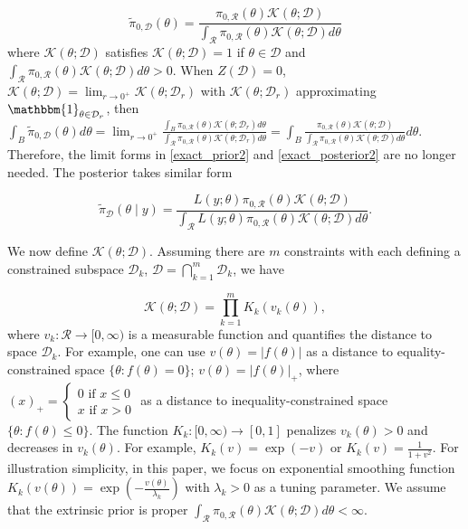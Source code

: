 \documentclass[10pt]{article}
\newcommand{\mc}[1]{\mathcal{#1}}
\DeclareMathOperator{\1}{\mathbbm{1}}
\begin{document}
\begin{equation}
\label{extrinsic_prior}
	\tilde{\pi}_{0,\mc D}(\theta) = \frac{ \pi_{0,\mc R}(\theta) \mc{K}( \theta; \mc D) }{ \int_{\mc R} \pi_{0,\mc R}(\theta) \mc{K}(\theta; \mc D)d\theta }
\end{equation}
where $\mc K(\theta; \mc D)$ satisfies $\mc K(\theta; \mc D)=1$ if $\theta\in \mc D$ and $ \int_{\mc R} \pi_{0,\mc R}(\theta) \mc{K}(\theta; \mc D)d\theta>0$. When $Z(\mc D)=0$, $\mc K(\theta;  \mc D)=\lim_{r\rightarrow 0^+}\mc K(\theta;  \mc D_r)$ with $\mc{K}(\theta; \mc D_r)$ approximating $\mathbbm{1}_{\theta\in  \mc D_r}$, then $
	\int_{B} \tilde{\pi}_{0,\mc D}(\theta) d \theta =  \lim_{r\rightarrow 0^+}\frac{\int_{B}  \pi_{0,\mc R}(\theta) \mc{K}( \theta; \mc D_r)d\theta }{ \int_{\mc R} \pi_{0,\mc R}(\theta) \mc{K}(\theta; \mc D_r)d\theta } = 	\int_{B} \frac{ \pi_{0,\mc R}(\theta) \mc{K}( \theta; \mc D) }{ \int_{\mc R} \pi_{0,\mc R}(\theta) \mc{K}(\theta; \mc D)d\theta } d\theta$. Therefore, the limit forms in \eqref{exact_prior2} and \eqref{exact_posterior2} are no longer needed. The posterior takes similar form

\begin{equation}
\label{extrinsic_posterior}
	\tilde{\pi}_{\mc D}(\theta \mid y) = \frac{ L(y;\theta)\pi_{0,\mc R}(\theta) \mc{K}( \theta; \mc D) }{ \int_{\mc R} L(y;\theta)\pi_{0,\mc R}(\theta) \mc{K}(\theta; \mc D)d\theta }.
\end{equation}

We now define $\mc K(\theta;\mc D)$. Assuming there are $m$ constraints with each defining a constrained subspace $\mc D_k$, $\mc D = \bigcap_{k=1}^m\mc D_k$, we have

\begin{equation}
\label{smoothing}
\mc K(\theta; \mc D)= \prod_{k=1}^m K_k(v_k(\theta)),
\end{equation}
where $v_k: \mc R \rightarrow [0,\infty)$ is a measurable function and quantifies the distance to space $\mc D_k$. For example, one can use $v(\theta)=|f(\theta)|$ as a distance to equality-constrained space  $\{\theta:f(\theta)=0\}$; $v(\theta)=|f(\theta)|_+$, where $(x)_+ = \left\{\begin{array}{cc}  0 \text{ if } x\le 0 \\ x \text{ if } x> 0\end{array}\right.$ as a distance to inequality-constrained space  $\{\theta:f(\theta) \le 0\}$. The function $K_k:[0,\infty)\rightarrow [0,1]$ penalizes $v_k(\theta)>0$ and decreases in $v_k(\theta)$. For example, $K_k(v)=\exp(-v)$ or $K_k(v)=\frac{1}{1+v^2}$. For illustration simplicity, in this paper, we focus on exponential smoothing function $K_k(v(\theta))=\exp(-\frac{v(\theta)}{\lambda_k})$ with $\lambda_k>0$ as a tuning parameter. We assume that the extrinsic prior is proper $ \int_{\mc R} \pi_{0,\mc R}(\theta) \mc{K}(\theta; \mc D)d\theta <\infty$.
\end{document}
